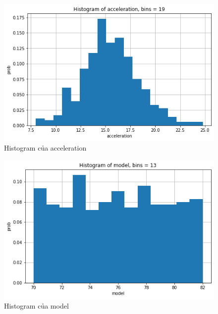 \documentclass[a4paper, 12pt]{article}
\begin{document}
        \begin{figure}[H]
            \centering
                \includegraphics[scale=0.9]{img/acceleration.png}
                \caption{Histogram của acceleration}
        \end{figure}
        
        \begin{figure}[H]
            \centering
                \includegraphics[scale=0.9]{img/model.png}
                \caption{Histogram của model}
        \end{figure}
        
\end{document}
